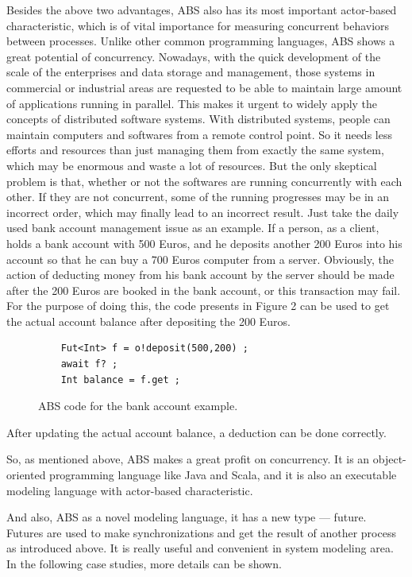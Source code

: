\documentclass[article,dr=phil,type=drfinal,colorback,accentcolor=tud9c]{tudthesis}
\begin{document}
  Besides the above two advantages, ABS also has its most important actor-based characteristic, which is of vital importance for measuring concurrent behaviors between processes. Unlike other common programming languages, ABS shows a great potential of concurrency. Nowadays, with the quick development of the scale of the enterprises and data storage and management, those systems in commercial or industrial areas are requested to be able to maintain large amount of applications running in parallel. This makes it urgent to widely apply the concepts of distributed software systems. With distributed systems, people can maintain computers and softwares from a remote control point. So it needs less efforts and resources than just managing them from exactly the same system, which may be enormous and waste a lot of resources. But the only skeptical problem is that, whether or not the softwares are running concurrently with each other. If they are not concurrent, some of the running progresses may be in an incorrect order, which may finally lead to an incorrect result. Just take the daily used bank account management issue as an example. If a person, as a client, holds a bank account with 500 Euros, and he deposits another 200 Euros into his account so that he can buy a 700 Euros computer from a server. Obviously, the action of deducting money from his bank account by the server should be made after the 200 Euros are booked in the bank account, or this transaction may fail. For the purpose of doing this, the code presents in Figure 2 can be used to get the actual account balance after depositing the 200 Euros.
  
  \begin{figure}[H]
  	\begin{lstlisting}
  	Fut<Int> f = o!deposit(500,200) ;
  	await f? ;
  	Int balance = f.get ;\end{lstlisting}
  	\caption[Caption for LOF]{ABS code for the bank account example.}
  \end{figure}
  
  After updating the actual account balance, a deduction can be done correctly.
  
  So, as mentioned above, ABS makes a great profit on concurrency. It is an object-oriented programming language like Java and Scala, and it is also an executable modeling language with actor-based characteristic.
  
  And also, ABS as a novel modeling language, it has a new type --- future. Futures are used to make synchronizations and get the result of another process as introduced above. It is really useful and convenient in system modeling area. In the following case studies, more details can be shown.
    
\end{document}

